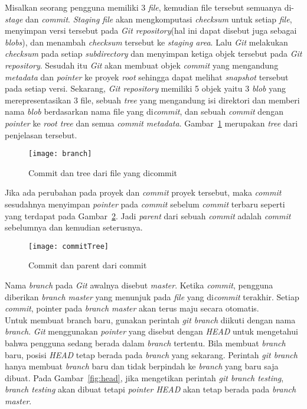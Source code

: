 Misalkan seorang pengguna memiliki 3 \textit{file}, kemudian file tersebut semuanya di-\textit{stage} dan \textit{commit}. \textit{Staging file} akan mengkomputasi \textit{checksum} untuk setiap \textit{file}, menyimpan versi tersebut pada \textit{Git repository}(hal ini dapat disebut juga sebagai \textit{blobs}), dan menambah \textit{checksum} tersebut ke \textit{staging area}. Lalu \textit{Git} melakukan \textit{checksum} pada setiap \textit{subdirectory} dan menyimpan ketiga objek tersebut pada \textit{Git repository}. Sesudah itu \textit{Git} akan membuat objek \textit{commit} yang mengandung \textit{metadata} dan \textit{pointer} ke proyek \textit{root} sehingga dapat melihat \textit{snapshot} tersebut pada setiap versi. Sekarang, \textit{Git repository} memiliki 5 objek yaitu 3 \textit{blob} yang merepresentasikan 3 file, sebuah \textit{tree} yang mengandung isi direktori dan memberi nama \textit{blob} berdasarkan nama file yang di\textit{commit}, dan sebuah \textit{commit} dengan \textit{pointer} ke \textit{root tree} dan semua \textit{commit metadata}. Gambar~\ref{fig:branch} merupakan \textit{tree} dari penjelasan tersebut.

\begin{figure}[H]
	\centering  
	\texttt{[image: branch]}  
	\caption[Commit dan tree dari file yang dicommit]{Commit dan tree dari file yang dicommit}
	\label{fig:branch} 
\end{figure}

Jika ada perubahan pada proyek dan \textit{commit} proyek tersebut, maka \textit{commit} sesudahnya menyimpan \textit{pointer} pada \textit{commit} sebelum \textit{commit} terbaru seperti yang terdapat pada Gambar~\ref{fig:commitTree}. Jadi \textit{parent} dari sebuah \textit{commit} adalah \textit{commit} sebelumnya dan kemudian seterusnya.

\begin{figure}[H]
	\centering  
	\texttt{[image: commitTree]}  
	\caption[Commit dan parent dari commit]{Commit dan parent dari commit}
	\label{fig:commitTree} 
\end{figure}

Nama \textit{branch} pada \textit{Git} awalnya disebut \textit{master}. Ketika \textit{commit}, pengguna diberikan \textit{branch master} yang menunjuk pada \textit{file} yang di\textit{commit} terakhir. Setiap \textit{commit}, pointer pada \textit{branch master} akan terus maju secara otomatis.\\ 

Untuk membuat branch baru, gunakan perintah \textit{git branch} diikuti dengan nama \textit{branch}. \textit{Git} menggunakan \textit{pointer} yang disebut dengan \textit{HEAD} untuk mengetahui bahwa pengguna sedang berada dalam \textit{branch} tertentu. Bila membuat \textit{branch} baru, posisi \textit{HEAD} tetap berada pada \textit{branch} yang sekarang. Perintah \textit{git branch} hanya membuat \textit{branch} baru dan tidak berpindah ke \textit{branch} yang baru saja dibuat. Pada Gambar~\ref{fig:head}, jika mengetikan perintah \textit{git branch testing}, \textit{branch testing} akan dibuat tetapi \textit{pointer HEAD} akan tetap berada pada \textit{branch master}.

